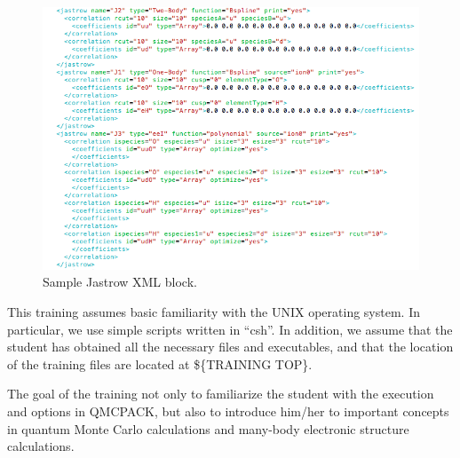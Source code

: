 \begin{figure}[ht!]
\begin{center}
\includegraphics[trim = 0mm 0mm 0mm 0mm, clip,width=1.0\columnwidth]{./figures/lab_advanced_molecules_xml_jastrow}
\end{center}
\caption{Sample Jastrow XML block.
\label{fig:lam_xml_jastrow}
}
\end{figure}

This training assumes basic familiarity with the UNIX operating system. In particular,
we use simple scripts written in “csh”. In addition, we assume that the student has obtained
all the necessary files and executables, and that the location of the training files are located
at \$\{TRAINING TOP\}.

The goal of the training not only to familiarize the student with the execution and
options in QMCPACK, but also to introduce him/her to important concepts in quantum
Monte Carlo calculations and many-body electronic structure calculations.



